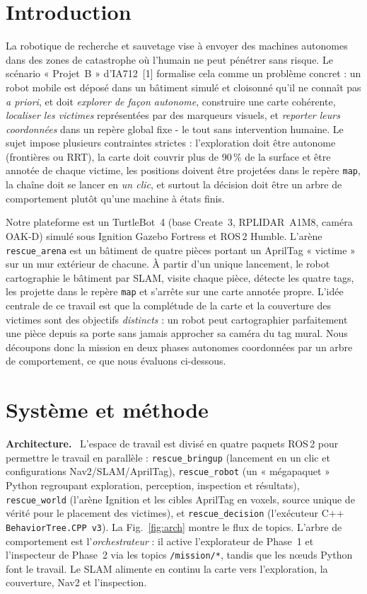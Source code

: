 \documentclass[10pt,twocolumn,a4paper]{article}
\newcommand{\head}[1]{\par\smallskip\noindent\textbf{\color{nccblue}#1}\ \ignorespaces}
\begin{document}
\section{Introduction}
La robotique de recherche et sauvetage vise \`a envoyer des machines autonomes dans des zones de
catastrophe o\`u l'humain ne peut p\'en\'etrer sans risque. Le sc\'enario « Projet~B » d'IA712~[1]
formalise cela comme un probl\`eme concret : un robot mobile est d\'epos\'e dans un b\^atiment simul\'e et
cloisonn\'e qu'il ne conna\^it pas \emph{a priori}, et doit \emph{explorer de fa\c{c}on autonome},
construire une carte coh\'erente, \emph{localiser les victimes} repr\'esent\'ees par des marqueurs
visuels, et \emph{reporter leurs coordonn\'ees} dans un rep\`ere global fixe - le tout sans intervention
humaine. Le sujet impose plusieurs contraintes strictes : l'exploration doit \^etre autonome (fronti\`eres
ou RRT), la carte doit couvrir plus de 90\,\% de la surface et \^etre annot\'ee de chaque victime, les
positions doivent \^etre projet\'ees dans le rep\`ere \texttt{map}, la cha\^ine doit se lancer en \emph{un
clic}, et surtout la d\'ecision doit \^etre un arbre de comportement plut\^ot qu'une machine \`a \'etats
finis.

Notre plateforme est un TurtleBot~4 (base Create~3, RPLIDAR~A1M8, cam\'era OAK-D) simul\'e sous Ignition
Gazebo Fortress et ROS\,2 Humble. L'ar\`ene \texttt{rescue\_arena} est un b\^atiment de quatre pi\`eces
portant un AprilTag « victime » sur un mur ext\'erieur de chacune. \`A partir d'un unique lancement, le
robot cartographie le b\^atiment par SLAM, visite chaque pi\`ece, d\'etecte les quatre tags, les projette
dans le rep\`ere \texttt{map} et s'arr\^ete sur une carte annot\'ee propre. L'id\'ee centrale de ce
travail est que la compl\'etude de la carte et la couverture des victimes sont des objectifs
\emph{distincts} : un robot peut cartographier parfaitement une pi\`ece depuis sa porte sans jamais
approcher sa cam\'era du tag mural. Nous d\'ecoupons donc la mission en deux phases autonomes
coordonn\'ees par un arbre de comportement, ce que nous \'evaluons ci-dessous.

\section{Syst\`eme et m\'ethode}
\head{Architecture.} L'espace de travail est divis\'e en quatre paquets ROS\,2 pour permettre le travail
en parall\`ele : \texttt{rescue\_bringup} (lancement en un clic et configurations Nav2/SLAM/AprilTag),
\texttt{rescue\_robot} (un « m\'egapaquet » Python regroupant exploration, perception, inspection et
r\'esultats), \texttt{rescue\_world} (l'ar\`ene Ignition et les cibles AprilTag en voxels, source unique
de v\'erit\'e pour le placement des victimes), et \texttt{rescue\_decision} (l'ex\'ecuteur C++
\texttt{BehaviorTree.CPP\,v3}). La Fig.~\ref{fig:arch} montre le flux de topics. L'arbre de comportement
est l'\emph{orchestrateur} : il active l'explorateur de Phase~1 et l'inspecteur de Phase~2 via les topics
\texttt{/mission/*}, tandis que les n\oe uds Python font le travail. Le SLAM alimente en continu la carte
vers l'exploration, la couverture, Nav2 et l'inspection.
\end{document}
